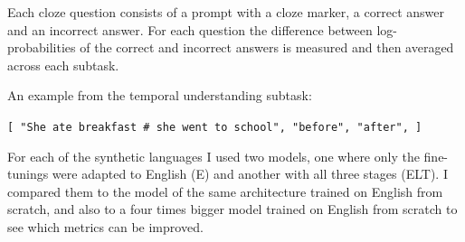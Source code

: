 \documentclass[a4paper, 11pt, oneside]{article}
\begin{document}
	Each cloze question consists of a prompt with a cloze marker, a correct answer
	and an incorrect answer. For each question the difference between log-probabilities
	of the correct and incorrect answers is measured and then averaged across each
	subtask.

	An example from the temporal understanding subtask:

	\texttt{[ "She ate breakfast \# she went to school", "before", "after", ] }

	For each of the synthetic languages I used two models, one where only the fine-tunings
	were adapted to English (E) and another with all three stages (ELT). I compared
	them to the model of the same architecture trained on English from scratch,
	and also to a four times bigger model trained on English from scratch to see
	which metrics can be improved.
\end{document}

